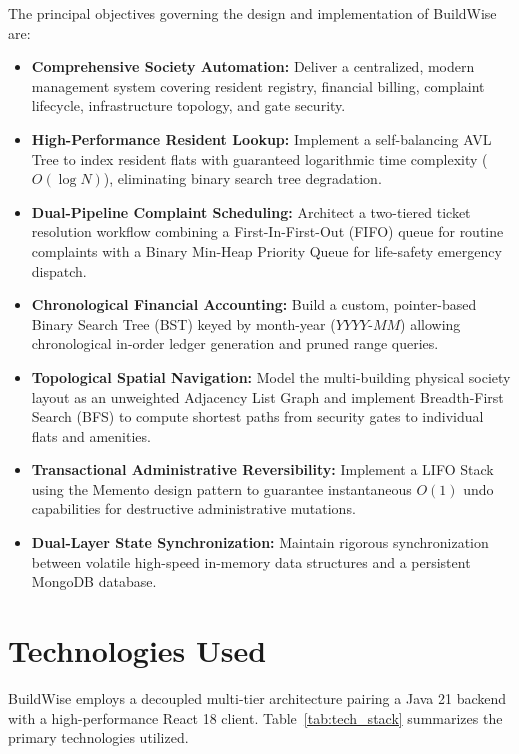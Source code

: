 \documentclass[12pt,a4paper]{article}
\begin{document}
The principal objectives governing the design and implementation of BuildWise are:
\begin{itemize}[leftmargin=1.5em]
    \item \textbf{Comprehensive Society Automation:} Deliver a centralized, modern management system covering resident registry, financial billing, complaint lifecycle, infrastructure topology, and gate security.
    \item \textbf{High-Performance Resident Lookup:} Implement a self-balancing AVL Tree to index resident flats with guaranteed logarithmic time complexity ($O(\log N)$), eliminating binary search tree degradation.
    \item \textbf{Dual-Pipeline Complaint Scheduling:} Architect a two-tiered ticket resolution workflow combining a First-In-First-Out (FIFO) queue for routine complaints with a Binary Min-Heap Priority Queue for life-safety emergency dispatch.
    \item \textbf{Chronological Financial Accounting:} Build a custom, pointer-based Binary Search Tree (BST) keyed by month-year ($YYYY\text{-}MM$) allowing chronological in-order ledger generation and pruned range queries.
    \item \textbf{Topological Spatial Navigation:} Model the multi-building physical society layout as an unweighted Adjacency List Graph and implement Breadth-First Search (BFS) to compute shortest paths from security gates to individual flats and amenities.
    \item \textbf{Transactional Administrative Reversibility:} Implement a LIFO Stack using the Memento design pattern to guarantee instantaneous $O(1)$ undo capabilities for destructive administrative mutations.
    \item \textbf{Dual-Layer State Synchronization:} Maintain rigorous synchronization between volatile high-speed in-memory data structures and a persistent MongoDB database.
\end{itemize}

\section{Technologies Used}

BuildWise employs a decoupled multi-tier architecture pairing a Java 21 backend with a high-performance React 18 client. Table~\ref{tab:tech_stack} summarizes the primary technologies utilized.
\end{document}
